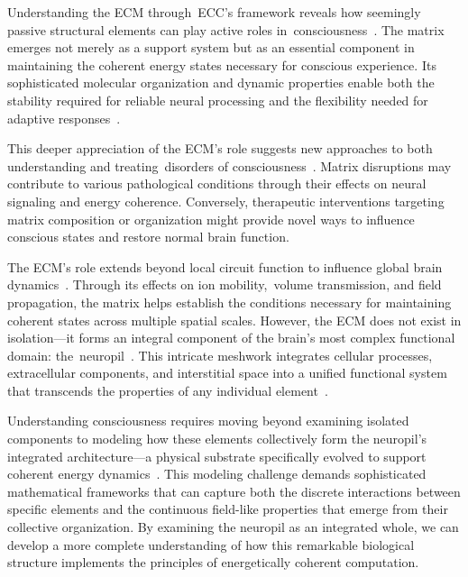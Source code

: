 Understanding the ECM through~ECC's framework reveals how seemingly passive structural elements can play active roles in~consciousness~\cite{Dityatev2010, breakspear2005dynamics}. The matrix emerges not merely as a support system but as an essential component in maintaining the coherent energy states necessary for conscious experience. Its sophisticated molecular organization and dynamic properties enable both the stability required for reliable neural processing and the flexibility needed for adaptive responses~\cite{Frischknecht2012, Dityatev2003}.

This deeper appreciation of the ECM's role suggests new approaches to both understanding and treating~disorders of consciousness~\cite{Burnside2014, Kwok2011}. Matrix disruptions may contribute to various pathological conditions through their effects on neural signaling and energy coherence. Conversely, therapeutic interventions targeting matrix composition or organization might provide novel ways to influence conscious states and restore normal brain function.

The ECM's role extends beyond local circuit function to influence global brain dynamics~\cite{Barros2011, Vargova2014}. Through its effects on ion mobility,~volume transmission, and field propagation, the matrix helps establish the conditions necessary for maintaining coherent states across multiple spatial scales. However, the ECM does not exist in isolation—it forms an integral component of the brain's most complex functional domain: the~neuropil~\cite{Dityatev2010, Kasthuri2015}. This intricate meshwork integrates cellular processes, extracellular components, and interstitial space into a unified functional system that transcends the properties of any individual element~\cite{Mishchenko2010, Korogod2015}.

Understanding consciousness requires moving beyond examining isolated components to modeling how these elements collectively form the neuropil's integrated architecture—a physical substrate specifically evolved to support coherent energy dynamics~\cite{Sykova2008, breakspear2005dynamics}. This modeling challenge demands sophisticated mathematical frameworks that can capture both the discrete interactions between specific elements and the continuous field-like properties that emerge from their collective organization. By examining the neuropil as an integrated whole, we can develop a more complete understanding of how this remarkable biological structure implements the principles of energetically coherent computation.

